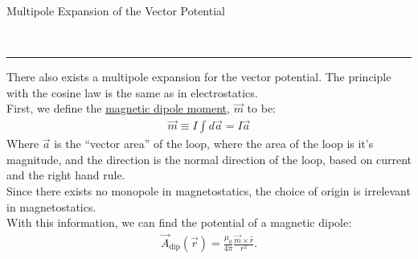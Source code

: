 \documentclass{article}
\newcommand{\header}[1]{\begin{large}\noindent #1\end{large}\\\rule{\textwidth}{0.5pt}}
\newcommand{\sgap}{\smallskip\\}
\begin{document}
\header{Multipole Expansion of the Vector Potential}
There also exists a multipole expansion for the vector potential. The principle with the 
cosine law is the same as in electrostatics.
\sgap
First, we define the \underline{magnetic dipole moment}, $\vec{m}$ to be:
\begin{align*}
    \vec{m} \equiv I \int d\vec{a} = I \vec{a}
\end{align*}
Where $\vec{a}$ is the ``vector area'' of the loop, where the area of the loop is it's 
magnitude, and the direction is the normal direction of the loop, based on current
and the right hand rule.
\sgap
Since there exists no monopole in magnetostatics, the choice of origin is irrelevant in 
magnetostatics. 
\sgap
With this information, we can find the potential of a magnetic dipole:
\begin{align*}
    \vec{A}_\textrm{dip}(\vec{r}) = \frac{\mu_0}{4\pi} \frac{\vec{m} \times \hat{r}}{r^2}.
\end{align*}
\end{document}
